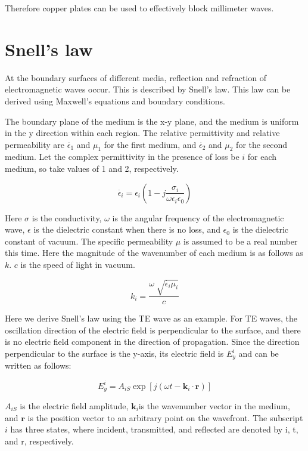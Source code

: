 \documentclass[a4paper,12pt]{report}
\begin{document}
Therefore copper plates can be used to effectively block millimeter waves.

\section{Snell's law}

At the boundary surfaces of different media, reflection and refraction of electromagnetic waves occur.
This is described by Snell's law.
This law can be derived using Maxwell's equations and boundary conditions.

The boundary plane of the medium is the x-y plane,
and the medium is uniform in the y direction within each region.
The relative permittivity and relative permeability are
$\dot{\epsilon_1}$ and $\mu_1$ for the first medium, and
$\dot{\epsilon_2}$ and $\mu_2$ for the second medium.
Let the complex permittivity in the presence of loss be
$i$ for each medium, so take values of 1 and 2, respectively.


\begin{equation}
  \dot{\epsilon_i} = \epsilon_i(1 - j\frac{\sigma_i}{\omega\epsilon_i\epsilon_0})
\end{equation}

Here $\sigma$ is the conductivity,
$\omega$ is the angular frequency of the electromagnetic wave,
$\epsilon$ is the dielectric constant when there is no loss, and
$\epsilon_0$ is the dielectric constant of vacuum.
The specific permeability $\mu$ is assumed to be a real number this time.
Here the magnitude of the wavenumber of each medium is as follows as $k$.
$c$ is the speed of light in vacuum.

\begin{equation}
  k_i = \frac{\omega\sqrt[]{\dot{\epsilon_i}\mu_i}}{c}
\end{equation}

Here we derive Snell's law using the TE wave as an example.
For TE waves,
the oscillation direction of the electric field is perpendicular to the surface,
and there is no electric field component in the direction of propagation.
Since the direction perpendicular to the surface is the y-axis,
its electric field is $E^i_y$ and can be written as follows:

\begin{equation}
  E^i_y = A_{iS}\exp[j(\omega t - \boldsymbol{k}_i\cdot\boldsymbol{r})]
\end{equation}

$A_{iS}$ is the electric field amplitude,
$\boldsymbol{k}_i$is the wavenumber vector in the medium, and
$\boldsymbol{r}$ is the position vector to an arbitrary point on the wavefront.
The subscript $i$ has three states,
where incident, transmitted, and reflected are denoted by i, t, and r, respectively.
\end{document}
